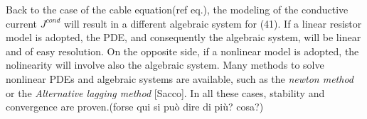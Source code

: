 \documentclass[a4paper]{article}
\begin{document}
Back to the case of the cable equation(ref eq.), the modeling of the conductive current $J^{cond}$ will result in a different algebraic system for (41). If a linear resistor model is adopted, the PDE, and consequently the algebraic system, will be linear and of easy resolution. On the opposite side, if a nonlinear model is adopted, the nolinearity will involve also the algebraic system. Many methods to solve nonlinear PDEs and algebraic systems are available, such as the \textit{newton method} or the \textit{Alternative lagging method} [Sacco]. In all these cases, stability and convergence are proven.(forse qui si  può dire di più? cosa?)
\end{document}
